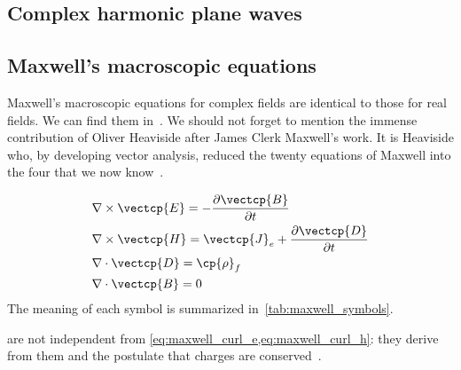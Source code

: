 \begin{refsection}
\FloatBarrier
\section{Complex harmonic plane waves}

\subsection{Maxwell's macroscopic equations}
\label{sec:maxwell_macroscopic}

Maxwell's macroscopic equations for complex fields are identical to those for real fields.
We can find them in~\textcite{jackson1998classical}.
We should not forget to mention the immense contribution of Oliver Heaviside after James Clerk Maxwell's work.
It is Heaviside who, by developing vector analysis, reduced the twenty equations of Maxwell into the four that we now know~\parencite{nahin2002oliver}.

\begin{subequations}
    \label{eq:complex_maxwell_macroscopic}
    \begin{align}
        &\nabla \times \vectcp{E} = -\frac{\partial \vectcp{B}}{\partial t}
        \label{eq:maxwell_curl_e}
        \\
        &\nabla \times \vectcp{H} = \vectcp{J}_e + \frac{\partial \vectcp{D}}{\partial t}
        \label{eq:maxwell_curl_h}
        \\
        &\nabla \cdot \vectcp{D}  = \cp{\rho}_f
        \label{eq:maxwell_div_d}
        \\
        &\nabla \cdot \vectcp{B}  = 0
        \label{eq:maxwell_div_b}
    \end{align}
\end{subequations}
The meaning of each symbol is summarized in~\cref{tab:maxwell_symbols}.


 are not independent from
\cref{eq:maxwell_curl_e,eq:maxwell_curl_h}: they derive from them and the postulate that charges are conserved~\parencite{stratton1941electromagnetic}.


\end{refsection}
